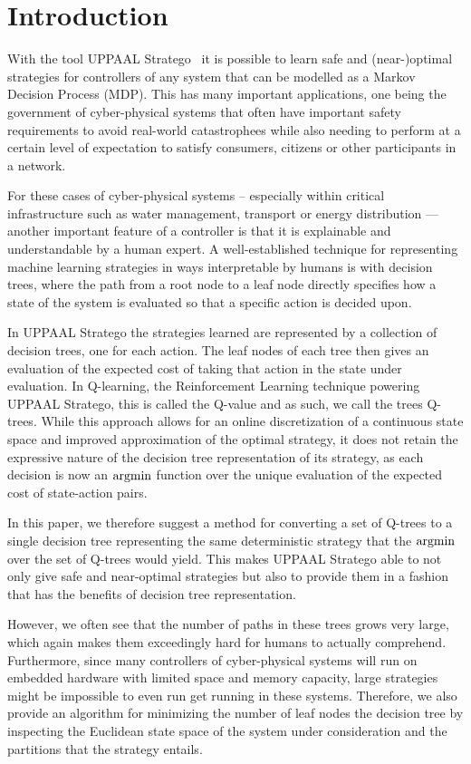 \section{Introduction}%
\label{sec:intro}

With the tool UPPAAL Stratego~\cite{David2015UppaalS} it is possible to learn
safe and (near-)optimal strategies for controllers of any system that can be
modelled as a Markov Decision Process (MDP). This has many important
applications, one being the government of cyber-physical systems that often have
important safety requirements to avoid real-world catastrophees while also
needing to perform at a certain level of expectation to satisfy consumers,
citizens or other participants in a network.

For these cases of cyber-physical systems -- especially within critical
infrastructure such as water management, transport or energy distribution ---
another important feature of a controller is that it is explainable and
understandable by a human expert. A well-established technique for representing
machine learning strategies in ways interpretable by humans is with decision
trees, where the path from a root node to a leaf node directly specifies how a
state of the system is evaluated so that a specific action is decided upon.

In UPPAAL Stratego the strategies learned are represented by a collection of
decision trees, one for each action. The leaf nodes of each tree then gives an
evaluation of the expected cost of taking that action in the state under
evaluation. In Q-learning, the Reinforcement Learning technique powering UPPAAL
Stratego, this is called the Q-value and as such, we call the trees Q-trees.
While this approach allows for an online discretization of a continuous state
space and improved approximation of the optimal strategy, it does not retain the
expressive nature of the decision tree representation of its strategy, as each
decision is now an $\operatorname*{argmin}$ function over the unique evaluation of the expected
cost of state-action pairs.

In this paper, we therefore suggest a method for converting a set of Q-trees to
a single decision tree representing the same deterministic strategy that the
$\operatorname*{argmin}$ over the set of Q-trees would yield. This makes UPPAAL Stratego able
to not only give safe and near-optimal strategies but also to provide them in a
fashion that has the benefits of decision tree representation.

However, we often see that the number of paths in these trees grows very large,
which again makes them exceedingly hard for humans to actually comprehend.
Furthermore, since many controllers of cyber-physical systems will run on
embedded hardware with limited space and memory capacity, large strategies might
be impossible to even run get running in these systems. Therefore, we also
provide an algorithm for minimizing the number of leaf nodes the decision tree
by inspecting the Euclidean state space of the system under consideration and
the partitions that the strategy entails.

